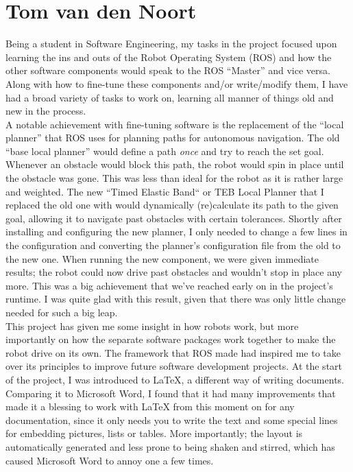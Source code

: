 \section{Tom van den Noort}

Being a student in Software Engineering, my tasks in the project focused upon learning the ins and outs of the Robot Operating System (ROS) and how the other software components would speak to the ROS ``Master'' and vice versa. 
Along with how to fine-tune these components and/or write/modify them, I have had a broad variety of tasks to work on, learning all manner of things old and new in the process.\\

A notable achievement with fine-tuning software is the replacement of the ``local planner'' that ROS uses for planning paths for autonomous navigation. 
The old ``base local planner'' would define a path \textit{once} and try to reach the set goal. 
Whenever an obstacle would block this path, the robot would spin in place until the obstacle was gone. 
This was less than ideal for the robot as it is rather large and weighted.
The new ``Timed Elastic Band`` or TEB Local Planner that I replaced the old one with would dynamically (re)calculate its path to the given goal, allowing it to navigate past obstacles with certain tolerances. 
Shortly after installing and configuring the new planner, I only needed to change a few lines in the configuration and converting the planner's configuration file from the old to the new one. 
When running the new component, we were given immediate results; the robot could now drive past obstacles and wouldn't stop in place any more. 
This was a big achievement that we've reached early on in the project's runtime. 
I was quite glad with this result, given that there was only little change needed for such a big leap.\\

This project has given me some insight in how robots work, but more importantly on how the separate software packages work together to make the robot drive on its own. 
The framework that ROS made had inspired me to take over its principles to improve future software development projects. 
At the start of the project, I was introduced to LaTeX, a different way of writing documents. 
Comparing it to Microsoft Word, I found that it had many improvements that made it a blessing to work with LaTeX from this moment on for any documentation, since it only needs you to write the text and some special lines for embedding pictures, lists or tables. 
More importantly; the layout is automatically generated and less prone to being shaken and stirred, which has caused Microsoft Word to annoy one a few times.\\

